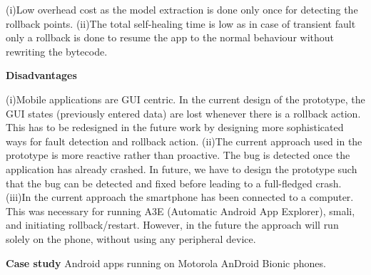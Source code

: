\begin{compactitem}
(i)Low overhead cost as the model extraction is done only once for detecting the rollback points.
(ii)The total self-healing time is low as in case of transient fault only a rollback is done to resume the app to the normal behaviour without rewriting the bytecode.


\item[\textbf{Disadvantages}] 

(i)Mobile applications are GUI centric. In the current design of the prototype, the GUI states (previously entered data) are lost whenever there is a rollback action. This has to be redesigned in the future work by designing more sophisticated ways for fault detection and rollback action.
(ii)The current approach used in the prototype is more reactive rather than proactive. The bug is detected once the application has already crashed. In future, we have to design the prototype such that the bug can be detected and fixed before leading to a full-fledged crash.
(iii)In the current approach the smartphone has been connected to a computer. This was necessary for running A3E (Automatic Android App Explorer), smali, and initiating rollback/restart. However, in the future the approach will run solely on the phone, without using any peripheral device.


\item[\textbf{Case study}] 
Android apps running on Motorola AnDroid Bionic phones.

\end{compactitem}

